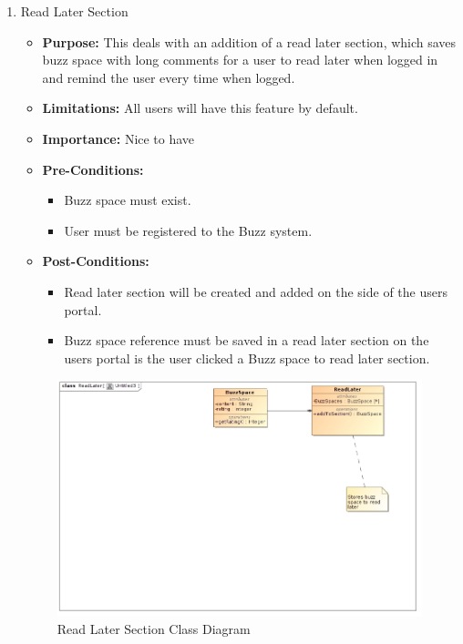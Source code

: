 \documentclass[11pt]{article}
\begin{document}
\begin{enumerate}
\newpage
\item Read Later Section

\begin{itemize}
\item \textbf{Purpose:}
This deals with an addition of a read later section, which saves
buzz space with long comments for a user to read later when logged
in and remind the user every time when logged.
\item\textbf{Limitations:} 
All users will have this feature by default.

\item \textbf{Importance:}  Nice to have
\item\textbf{Pre-Conditions: }
	\begin{itemize}
	\item Buzz space must exist.
	\item User must be registered to the Buzz system.

	\end{itemize}

\item\textbf{Post-Conditions: }
	\begin{itemize}
	\item Read later section will be created and added on the side of the
users portal.
	\item Buzz space reference must be saved in a read later section on the
users portal is the user clicked a Buzz space to read later section.
	
	\end{itemize}
\end{itemize}

\begin{figure}[H]	
\graphicspath{ {../Diagrams/sfiso/} }
    	\includegraphics[scale=0.5]{readC.jpg}
    	\caption{Read Later Section Class Diagram}
	\end{figure}


\end{enumerate}
\end{document}
